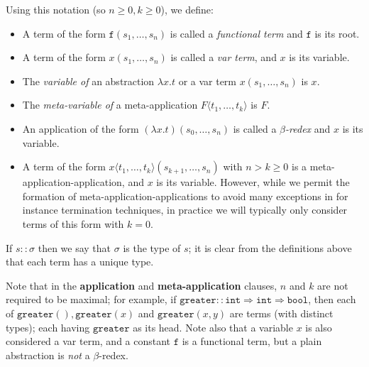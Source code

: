 \documentclass{lmcs}
\theoremstyle{theorem}\newtheorem{theorem}{Theorem}
\theoremstyle{theorem}\newtheorem{lemma}[theorem]{Lemma}
\theoremstyle{theorem}\newtheorem{corollary}[theorem]{Corollary}
\theoremstyle{definition}\newtheorem{definition}[theorem]{Definition}
\theoremstyle{definition}\newtheorem{example}[theorem]{Example}
\newcommand{\atype}{\sigma}
\newcommand{\identifier}[1]{\mathtt{#1}}
\newcommand{\afun}{\identifier{f}}
\newcommand{\avar}{x}
\newcommand{\bvar}{y}
\newcommand{\ameta}{F}
\newcommand{\clause}[1]{\textbf{#1}}
\newcommand{\abs}[2]{\lambda #1.#2}
\newcommand{\meta}[2]{#1\langle#2\rangle}
\newcommand{\arrtype}{\Rightarrow}
\newcommand{\symb}[1]{\mathtt{#1}}
\begin{document}
Using this notation (so $n \geq 0, k \geq 0$), we define:
\begin{itemize}
\item A term of the form $\afun(s_1,\dots,s_n)$ is called a \emph{functional
  term} and $\afun$ is its root.
\item A term of the form $\avar(s_1,\dots,s_n)$ is called a \emph{var term}, and
  $\avar$ is its variable.
\item The \emph{variable of} an abstraction $\abs{\avar}{t}$ or a var term
  $\avar(s_1,\dots,s_n)$ is $\avar$.
\item The \emph{meta-variable of} a meta-application $\meta{\ameta}{t_1,\dots,
  t_k}$ is $\ameta$.
\item An application of the form $(\abs{\avar}{t})(s_0,\dots,s_n)$ is called a
  \emph{$\beta$-redex} and $\avar$ is its variable.
\item A term of the form $\meta{x}{t_1,\dots,t_k}(s_{k+1},\dots,s_n)$ with
  $n > k \geq 0$ is a meta-application-application, and $\avar$ is its variable.
  However, while we permit the formation of meta-application-applications to
  avoid many exceptions in for instance termination techniques, in practice we
  will typically only consider terms of this form with $k = 0$.
\end{itemize}

If $s :: \atype$ then we say that $\atype$ is the type of $s$; it is clear from
the definitions above that each term has a unique type.

Note that in the \clause{application} and \clause{meta-application} clauses, $n$
and $k$ are not required to be maximal; for example, if $\symb{greater} ::
\mathtt{int} \arrtype \mathtt{int} \arrtype \mathtt{bool}$, then each of
$\symb{greater}(),\symb{greater}(\avar)$ and $\symb{greater}(\avar,\bvar)$ are
terms (with distinct types); each having $\symb{greater}$ as its head.
Note also that a variable $\avar$ is also considered a var term, and a constant
$\afun$ is a functional term, but a plain abstraction is \emph{not} a
$\beta$-redex.
\end{document}

